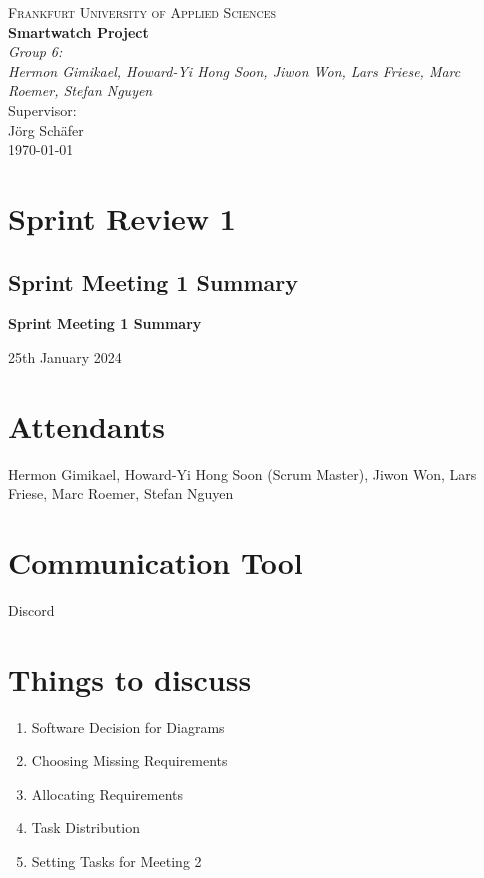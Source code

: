 \documentclass{article}
\begin{document}
\begin{titlepage}
    \centering
    \vspace*{0cm}
    {\scshape\Large Frankfurt University of Applied Sciences}\\[3cm]
    {\huge\bfseries Smartwatch Project}\\[8cm]
    {\Large\itshape Group 6:}\\
    {\Large\itshape Hermon Gimikael, Howard-Yi Hong Soon, Jiwon Won, Lars Friese, Marc Roemer, Stefan Nguyen}\\[4cm]
    Supervisor:\\
    Jörg Schäfer\\[3cm]
    {\large \today}
\end{titlepage}

\tableofcontents
\newpage

\section{Sprint Review 1}
\subsection{Sprint Meeting 1 Summary}
\begin{center}
    {\Large \textbf{Sprint Meeting 1 Summary}}
    
    \vspace{0.5cm}
    
    {\large 25th January 2024}
\end{center}

\section*{Attendants}
Hermon Gimikael, Howard-Yi Hong Soon (Scrum Master), Jiwon Won, Lars Friese, Marc Roemer, Stefan Nguyen

\section*{Communication Tool}
Discord

\section*{Things to discuss}
\begin{enumerate}
    \item Software Decision for Diagrams
    \item Choosing Missing Requirements
    \item Allocating Requirements
    \item Task Distribution
    \item Setting Tasks for Meeting 2
\end{enumerate}
\end{document}
